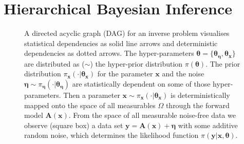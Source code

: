 \section{Hierarchical Bayesian Inference}
\label{sec:bayes}
\begin{figure}[ht!]
	\centering
	\caption[Hierarchical Bayesian Model]{A directed acyclic graph (DAG) for an inverse problem visualises statistical dependencies as solid line arrows and deterministic dependencies as dotted arrows.
		The hyper-parameters $\bm{\theta} = \{\bm{\theta}_{\bm{\eta}},\bm{\theta}_{\bm{x}}\} $ are distributed as ($\sim$) the hyper-prior distribution $\pi(\bm{\theta})$.
		The prior distribution $ \pi_{\bm{x}}(\cdot|\bm{\theta}_{\bm{x}})$ for the parameter $\bm{x}$ and the noise  $\bm{\eta} \sim \pi_{\bm{\eta}}(\cdot|\bm{\theta}_{\bm{\eta}})$ are statistically dependent on some of those hyper-parameters.
		Then a parameter $\bm{x} \sim \pi_{\bm{x}}(\cdot|\bm{\theta}_{\bm{x}})$ is deterministically mapped onto the space of all measurables $\Omega$ through the forward model $\bm{A}(\bm{x})$.
		From the space of all measurable noise-free data we observe (square box) a data set $\bm{y} = \bm{A}(\bm{x}) + \bm{\eta}$ with some additive random noise, which determines the likelihood function $\pi(\bm{y}|\bm{x},\bm{\theta})$.}
	\label{fig:FirstDAG}
\end{figure}

